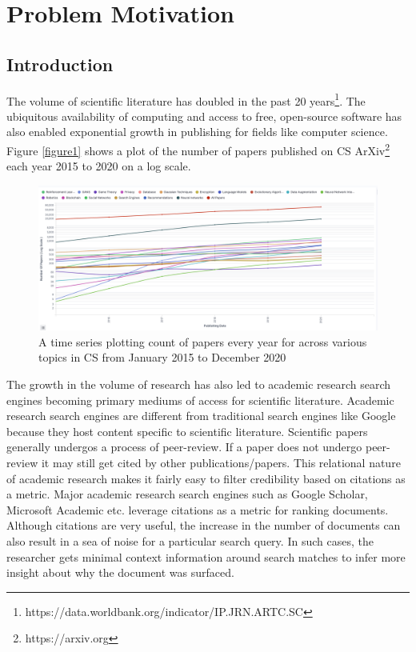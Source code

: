\chapter{Problem Motivation}

\section{Introduction}    

The volume of scientific literature has doubled in the past 20 years\footnote{https://data.worldbank.org/indicator/IP.JRN.ARTC.SC}.  
The ubiquitous availability of computing and access to free, open-source software has also enabled exponential growth in publishing for fields like computer science.  
Figure \ref{figure1} shows a plot of the number of papers published on CS ArXiv\footnote{https://arxiv.org} each year 2015 to 2020 on a log scale. 

\begin{figure}[h]
    \centering
    \includegraphics[width=\maxwidth{\textwidth}]{src/images/num-papers.pdf}
    \caption{ A time series plotting count of papers every year for across various topics in CS from January 2015 to December 2020}
    \label{figure\arabic{figurecounter}}
\end{figure}

The growth in the volume of research has also led to academic research search engines becoming primary mediums of access for scientific literature. 
Academic research search engines are different from traditional search engines like Google because they host content specific to scientific literature. 
Scientific papers generally undergos a process of peer-review. If a paper does not undergo peer-review it may still get cited by other publications/papers. This relational nature of academic research makes it fairly easy to filter credibility based on citations as a metric. Major academic research search engines such as Google Scholar, Microsoft Academic etc. leverage citations as a metric for ranking documents. Although citations are very useful, the increase in the number of documents can also result in a sea of noise for a particular search query. In such cases, the researcher gets minimal context information around search matches to infer more insight about why the document was surfaced. 

